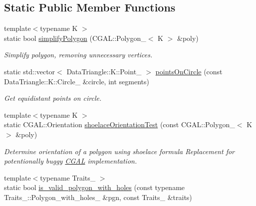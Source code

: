 \subsection*{Static Public Member Functions}
\begin{DoxyCompactItemize}
\item 
{\footnotesize template$<$typename K $>$ }\\static bool \mbox{\hyperlink{classpepr3d_1_1_geometry_utils_a6fe5d1ec681688da1e249a0f87a4944d}{simplify\+Polygon}} (C\+G\+A\+L\+::\+Polygon\+\_$<$ K $>$ \&poly)
\begin{DoxyCompactList}\small\item\em Simplify polygon, removing unnecessary vertices. \end{DoxyCompactList}\item 
\mbox{\label{classpepr3d_1_1_geometry_utils_aa40d71268a74cdeb820d931175f14df0}} 
static std\+::vector$<$ Data\+Triangle\+::\+K\+::\+Point\+\_ $>$ \mbox{\hyperlink{classpepr3d_1_1_geometry_utils_aa40d71268a74cdeb820d931175f14df0}{points\+On\+Circle}} (const Data\+Triangle\+::\+K\+::\+Circle\+\_ \&circle, int segments)
\begin{DoxyCompactList}\small\item\em Get equidistant points on circle. \end{DoxyCompactList}\item 
\mbox{\label{classpepr3d_1_1_geometry_utils_a376d662a35f0d4583276472d4576ae7b}} 
{\footnotesize template$<$typename K $>$ }\\static C\+G\+A\+L\+::\+Orientation \mbox{\hyperlink{classpepr3d_1_1_geometry_utils_a376d662a35f0d4583276472d4576ae7b}{shoelace\+Orientation\+Test}} (const C\+G\+A\+L\+::\+Polygon\+\_$<$ K $>$ \&poly)
\begin{DoxyCompactList}\small\item\em Determine orientation of a polygon using shoelace formula Replacement for potentionally buggy \mbox{\hyperlink{namespace_c_g_a_l}{C\+G\+AL}} implementation. \end{DoxyCompactList}\item 
\mbox{\label{classpepr3d_1_1_geometry_utils_ab7efa1cf650e08d63cfae3f9a7a5c067}} 
{\footnotesize template$<$typename Traits\+\_ $>$ }\\static bool \mbox{\hyperlink{classpepr3d_1_1_geometry_utils_ab7efa1cf650e08d63cfae3f9a7a5c067}{is\+\_\+valid\+\_\+polygon\+\_\+with\+\_\+holes}} (const typename Traits\+\_\+::\+Polygon\+\_\+with\+\_\+holes\+\_ \&pgn, const Traits\+\_ \&traits)

\end{DoxyCompactItemize}
